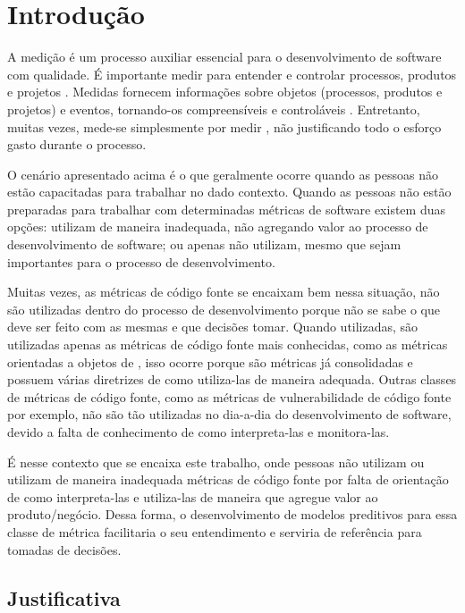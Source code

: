 \chapter{Introdução} \label{cap:introducao}

A medição é um processo auxiliar essencial para o desenvolvimento de software
com qualidade. É importante medir para entender e controlar processos, produtos 
e projetos \cite{ministerio_processo2012}. Medidas fornecem informações sobre 
objetos (processos, produtos e projetos) e eventos, tornando-os compreensíveis 
e controláveis \cite{fenton&pfleenger98}. Entretanto, muitas vezes, mede-se
simplesmente por medir \cite{ministerio_processo2012}, não justificando todo o 
esforço gasto durante o processo.

O cenário apresentado acima é o que geralmente ocorre quando as pessoas não estão
capacitadas para trabalhar no dado contexto. Quando as pessoas não estão
preparadas para trabalhar com determinadas métricas de software existem duas opções:
utilizam de maneira inadequada, não agregando valor ao processo de desenvolvimento
de software; ou apenas não utilizam, mesmo que sejam importantes para o processo de
desenvolvimento.

Muitas vezes, as métricas de código fonte se encaixam bem nessa situação, não são 
utilizadas dentro do processo de desenvolvimento porque não se sabe o que deve ser
feito com as mesmas e que decisões tomar. Quando utilizadas, são utilizadas apenas
as métricas de código fonte mais conhecidas, como as 
métricas orientadas a objetos de , isso ocorre 
porque são métricas já consolidadas
e possuem várias diretrizes de como utiliza-las de maneira adequada. Outras classes 
de métricas de código fonte, como as métricas de vulnerabilidade de código fonte 
por exemplo, não são tão utilizadas no dia-a-dia do desenvolvimento de software, 
devido a falta de conhecimento de como interpreta-las e monitora-las.

É nesse contexto que se encaixa este trabalho, onde pessoas não utilizam ou utilizam
de maneira inadequada métricas de código fonte por falta de orientação de como 
interpreta-las e utiliza-las de maneira que agregue valor ao produto/negócio.
Dessa forma, o desenvolvimento de modelos preditivos para essa classe de métrica
facilitaria o seu entendimento e serviria de referência para tomadas de
decisões.

\section{Justificativa}

